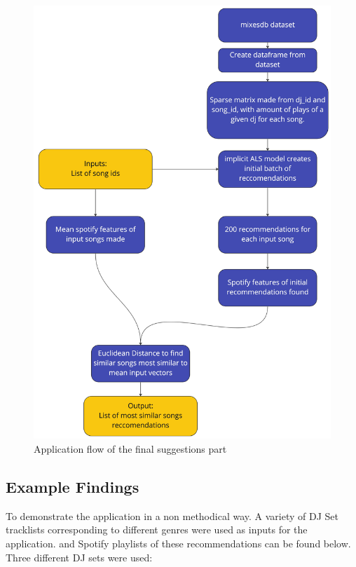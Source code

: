\begin{figure}[H]
	\includegraphics[scale=0.1]{images/application_app_flow}
	\centering
	\caption{Application flow of the final suggestions part} 
\end{figure}

\subsection{Example Findings}
To demonstrate the application in a non methodical way. A variety of DJ Set tracklists corresponding to different genres were used as inputs for the application. and Spotify playlists of these recommendations can be found below.  Three different DJ sets were used:

